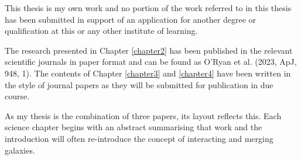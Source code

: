 


\begin{declaration}        %

This thesis is my own work and no portion of the work referred to in this thesis has been submitted in support of an application for another degree or qualification at this or any other institute of learning.

The research presented in Chapter \ref{chapter2} has been published in the relevant scientific journals in paper format and can be found as O'Ryan et al. (2023, ApJ, 948, 1). The contents of Chapter \ref{chapter3} and \ref{chapter4} have been written in the style of journal papers as they will be submitted for publication in due course.

As my thesis is the combination of three papers, its layout reflects this. Each science chapter begins with an abstract summarising that work and the introduction will often re-introduce the concept of interacting and merging galaxies. 

\end{declaration}


